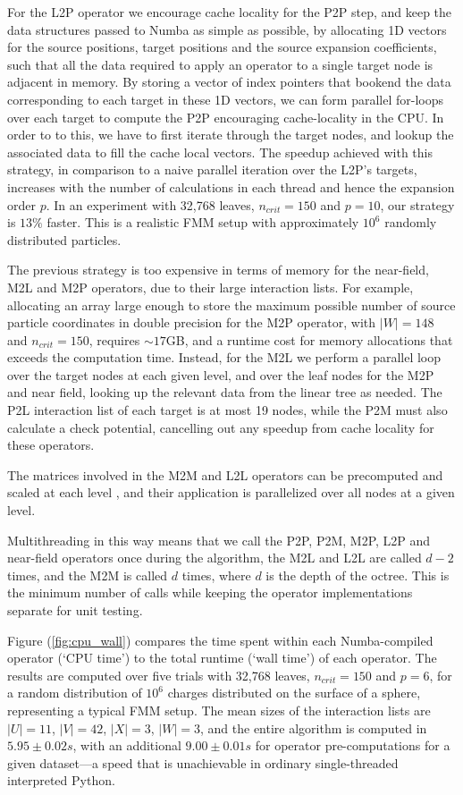 \documentclass{IEEEcsmag}
\begin{document}
For the L2P operator we encourage cache locality for the P2P step, and keep the data structures passed to Numba as simple as possible, by allocating 1D vectors for the source positions, target positions and the source expansion coefficients, such that all the data required to apply an operator to a single target node is adjacent in memory. By storing a vector of index pointers that bookend the data corresponding to each target in these 1D vectors, we can form parallel for-loops over each target to compute the P2P encouraging cache-locality in the CPU. In order to to this, we have to first iterate through the target nodes, and lookup the associated data to fill the cache local vectors.
The speedup achieved with this strategy, in comparison to a naive parallel iteration over the L2P's targets, increases with the number of calculations in each thread and hence the expansion order $p$. In an experiment with 32,768 leaves, $n_{crit} = 150$ and $p=10$, our strategy is $13\%$ faster. This is a realistic FMM setup with approximately $10^6$ randomly distributed particles.

The previous strategy is too expensive in terms of memory for the near-field, M2L and M2P operators, due to their large interaction lists. For example, allocating an array large enough to store the maximum possible number of source particle coordinates in double precision for the M2P operator, with $|W|=148$ and $n_{crit}=150$, requires $\sim 17$GB, and a runtime cost for memory allocations that exceeds the computation time. Instead, for the M2L we perform a parallel loop over the target nodes at each given level, and over the leaf nodes for the M2P and near field, looking up the relevant data from the linear tree as needed. The P2L interaction list of each target is at most 19 nodes, while the P2M must also calculate a check potential, cancelling out any speedup from cache locality for these operators.

The matrices involved in the M2M and L2L operators can be precomputed and scaled at each level \cite{Wang2021}, and their application is parallelized over all nodes at a given level.

Multithreading in this way means that we call the P2P, P2M, M2P, L2P and near-field operators once during the algorithm, the M2L and L2L are called $d-2$ times, and the M2M is called $d$ times, where $d$ is the depth of the octree. This is the minimum number of calls while keeping the operator implementations separate for unit testing.

Figure (\ref{fig:cpu_wall}) compares the time spent within each Numba-compiled operator (`CPU time') to the total runtime (`wall time') of each operator. The results are computed over five trials with 32,768 leaves,  $n_{crit}=150$ and $p=6$, for a random distribution of $10^6$ charges distributed on the surface of a sphere, representing a typical FMM setup. The mean sizes of the interaction lists are $|U|=11$, $|V|=42$, $|X|=3$, $|W|=3$, and the entire algorithm is computed in $5.95 \pm 0.02 s$, with an additional $9.00 \pm 0.01 s$ for operator pre-computations for a given dataset---a speed that is unachievable in ordinary single-threaded interpreted Python.
\end{document}
